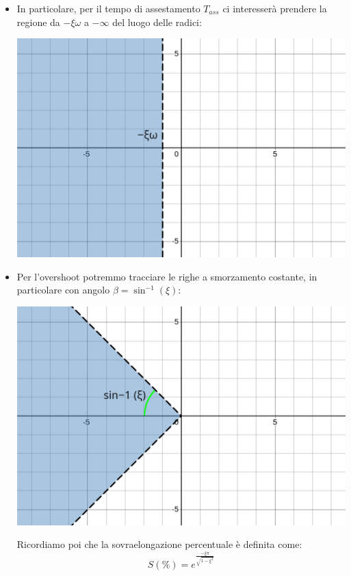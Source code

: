 \documentclass[a4paper,11pt]{article}
\begin{document}
\begin{itemize}
	\item 
		In particolare, per il tempo di assestamento $T_{ass}$ ci interesserà prendere la regione da $-\xi\omega$ a $-\infty$ del luogo delle radici:
		\begin{center}
			\includegraphics[scale=0.28]{../figures/fixed_time_region_cont.png}
		\end{center}

		\newpage

	\item Per l'overshoot potremmo tracciare le righe a smorzamento costante, in particolare con angolo $\beta = \sin^{-1} (\xi) $:
		\begin{center}
			\includegraphics[scale=0.28]{../figures/fixed_damping_region_cont.png}
		\end{center}

		Ricordiamo poi che la sovraelongazione percentuale è definita come:
		$$
		S(\%) = e^{ \frac{-\xi \pi}{\sqrt{1 - \xi^2}} }
		$$


\end{itemize}
\end{document}
